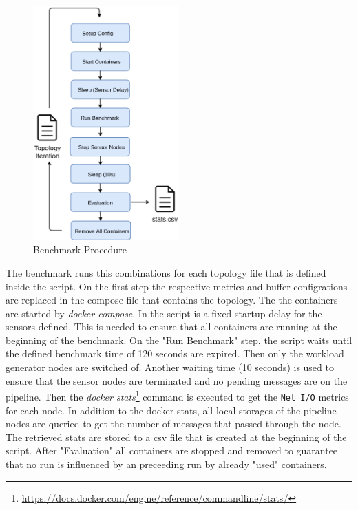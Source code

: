 \begin{figure}[H]
	\center
	\includegraphics[width=0.5\textwidth]{figures/dataoverheadsetup.png}
	\caption{Benchmark Procedure}
	\label{fig:benchmark}
\end{figure}

The benchmark runs this combinations for each topology file that is defined inside the script. On the first step the respective metrics and buffer configrations are replaced in the compose file that contains the topology.
The the containers are started by \emph{docker-compose}. In the script is a fixed startup-delay for the sensors defined. This is needed to ensure that all containers are running at the beginning of the benchmark. On the "Run Benchmark" step, the script waits until the defined benchmark time of 120 seconds are expired. Then only the workload generator nodes are switched of. Another waiting time (10 seconds) is used to ensure that the sensor nodes are terminated and no pending messages are on the pipeline. Then the \emph{docker stats}\footnote{\url{https://docs.docker.com/engine/reference/commandline/stats/}} command is executed to get the \texttt{Net I/O} metrics for each node. In addition to the docker stats, all local storages of the pipeline nodes are queried to get the number of messages that passed through the node. The retrieved stats are stored to a csv file that is created at the beginning of the script.
After "Evaluation" all containers are stopped and removed to guarantee that no run is influenced by an preceeding run by already "used" containers.

